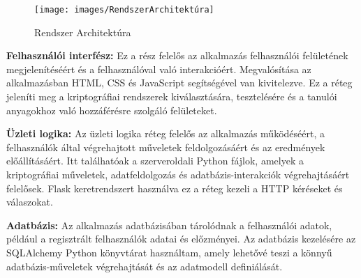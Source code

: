 \begin{figure}[!h]
	\centering
	\texttt{[image: images/RendszerArchitektúra]}
	\caption{Rendszer Architektúra}
\end{figure}

\textbf{Felhasználói interfész:} Ez a rész felelős az alkalmazás felhasználói felületének megjelenítéséért és a felhasználóval való interakcióért. Megvalósítása az alkalmazásban HTML, CSS és JavaScript segítségével van kivitelezve. Ez a réteg jeleníti meg a kriptográfiai rendszerek kiválasztására, tesztelésére és a tanulói anyagokhoz való hozzáférésre szolgáló felületeket.

\textbf{Üzleti logika:} Az üzleti logika réteg felelős az alkalmazás működéséért, a felhasználók által végrehajtott műveletek feldolgozásáért és az eredmények előállításáért. Itt találhatóak a szerveroldali Python fájlok, amelyek a kriptográfiai műveletek, adatfeldolgozás és adatbázis-interakciók végrehajtásáért felelősek. Flask keretrendszert használva ez a réteg kezeli a HTTP kéréseket és válaszokat.

\textbf{Adatbázis:} Az alkalmazás adatbázisában tárolódnak a felhasználói adatok, például a regisztrált felhasználók adatai és előzményei. Az adatbázis kezelésére az SQLAlchemy Python könyvtárat használtam, amely lehetővé teszi a könnyű adatbázis-műveletek végrehajtását és az adatmodell definiálását.


